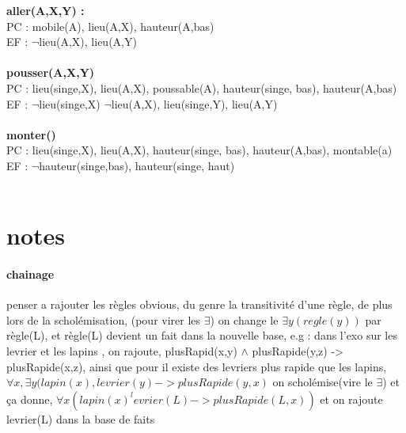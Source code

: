 \documentclass{article}
\begin{document}
\textbf{aller(A,X,Y) : }\\
PC : mobile(A), lieu(A,X), hauteur(A,bas)\\
EF : $\neg$lieu(A,X), lieu(A,Y)\\\\

\textbf{pousser(A,X,Y)}\\
PC : lieu(singe,X), lieu(A,X), poussable(A), hauteur(singe, bas), hauteur(A,bas)\\
EF : $\neg$lieu(singe,X) $\neg$lieu(A,X), lieu(singe,Y), lieu(A,Y)\\\\

\textbf{monter()}\\
PC : lieu(singe,X), lieu(A,X), hauteur(singe, bas), hauteur(A,bas), montable(a)\\
EF : $\neg$hauteur(singe,bas), hauteur(singe, haut)\\\\

\section{notes}
\paragraph{chainage} penser a rajouter les règles obvious, du genre la transitivité d'une règle, de plus lors de la scholémisation, (pour virer les $\exists$) on change le $\exists y (regle(y)) $ par règle(L), et règle(L) devient un fait dans la nouvelle base, e.g : dans l'exo sur les levrier et les lapins , on rajoute, plusRapid(x,y) $\wedge$ plusRapide(y,z) -> plusRapide(x,z), ainsi que pour il existe des levriers plus rapide que les lapins, $\forall x, \exists y (lapin(x),levrier(y) -> plusRapide(y,x)$ on scholémise(vire le $\exists$) et ça donne, $\forall x (lapin(x) ^ levrier(L) -> plusRapide(L,x))$ et on rajoute levrier(L) dans la base de faits 
\end{document}
